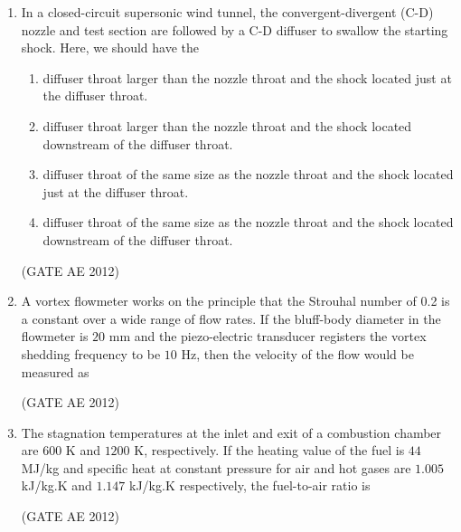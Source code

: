 \documentclass[journal,12pt,onecolumn]{IEEEtran}
\theoremstyle{remark}
\begin{document}
\begin{enumerate}
\item In a closed-circuit supersonic wind tunnel, the convergent-divergent (C-D) nozzle and test section are followed by a C-D diffuser to swallow the starting shock. Here, we should have the
\begin{enumerate}
\item diffuser throat larger than the nozzle throat and the shock located just at the diffuser throat.
\item diffuser throat larger than the nozzle throat and the shock located downstream of the diffuser throat.
\item diffuser throat of the same size as the nozzle throat and the shock located just at the diffuser throat.
\item diffuser throat of the same size as the nozzle throat and the shock located downstream of the diffuser throat.
\end{enumerate}
\hfill(GATE AE 2012)



\item A vortex flowmeter works on the principle that the Strouhal number of 0.2 is a constant over a wide range of flow rates. If the bluff-body diameter in the flowmeter is $20$ mm and the piezo-electric transducer registers the vortex shedding frequency to be $10$ Hz, then the velocity of the flow would be measured as
\begin{enumerate}
\end{enumerate}
\hfill(GATE AE 2012)



\item The stagnation temperatures at the inlet and exit of a combustion chamber are $600$ K and $1200$ K, respectively. If the heating value of the fuel is $44$ MJ/kg and specific heat at constant pressure for air and hot gases are $1.005$ kJ/kg.K and $1.147$ kJ/kg.K respectively, the fuel-to-air ratio is
\begin{enumerate}
\end{enumerate}
\hfill(GATE AE 2012)




\end{enumerate}
\end{document}
